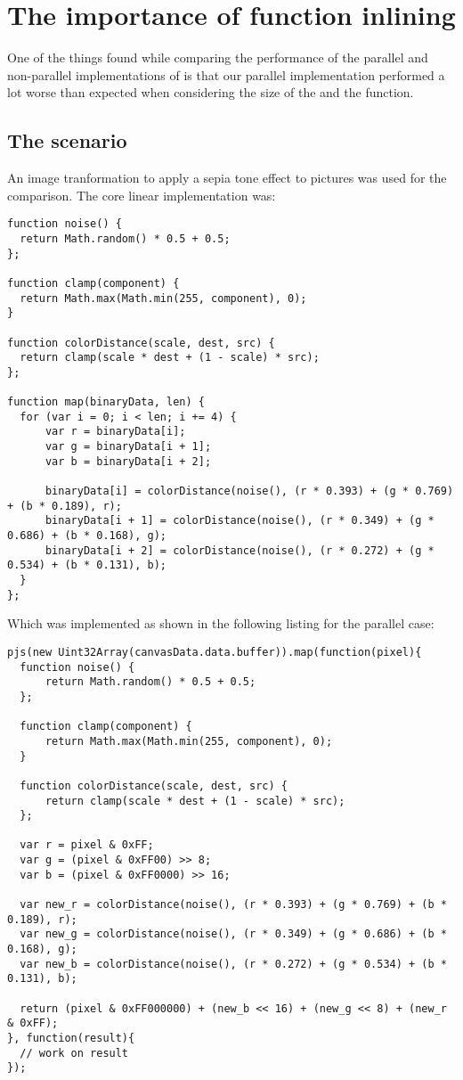 \section{The importance of function inlining}
One of the things found while comparing the performance of the parallel and non-parallel implementations of  is that our parallel implementation performed a lot worse than expected when considering the size of the \ttarray{} and the  function.

\subsection{The scenario}
An image tranformation to apply a sepia tone effect to pictures was used for the comparison. The core linear implementation was:
\begin{lstlisting}[caption=Sepia tone linear implementation]
function noise() {
  return Math.random() * 0.5 + 0.5;
};

function clamp(component) {
  return Math.max(Math.min(255, component), 0);
}

function colorDistance(scale, dest, src) {
  return clamp(scale * dest + (1 - scale) * src);
};

function map(binaryData, len) {
  for (var i = 0; i < len; i += 4) {
      var r = binaryData[i];
      var g = binaryData[i + 1];
      var b = binaryData[i + 2];

      binaryData[i] = colorDistance(noise(), (r * 0.393) + (g * 0.769) + (b * 0.189), r);
      binaryData[i + 1] = colorDistance(noise(), (r * 0.349) + (g * 0.686) + (b * 0.168), g);
      binaryData[i + 2] = colorDistance(noise(), (r * 0.272) + (g * 0.534) + (b * 0.131), b);
  }
};
\end{lstlisting}


Which was implemented as shown in the following listing for the parallel case:
\begin{lstlisting}[caption=Sepia tone initial parallel implementation]
pjs(new Uint32Array(canvasData.data.buffer)).map(function(pixel){
  function noise() {
      return Math.random() * 0.5 + 0.5;
  };

  function clamp(component) {
      return Math.max(Math.min(255, component), 0);
  }

  function colorDistance(scale, dest, src) {
      return clamp(scale * dest + (1 - scale) * src);
  };

  var r = pixel & 0xFF;
  var g = (pixel & 0xFF00) >> 8;
  var b = (pixel & 0xFF0000) >> 16;

  var new_r = colorDistance(noise(), (r * 0.393) + (g * 0.769) + (b * 0.189), r);
  var new_g = colorDistance(noise(), (r * 0.349) + (g * 0.686) + (b * 0.168), g);
  var new_b = colorDistance(noise(), (r * 0.272) + (g * 0.534) + (b * 0.131), b);

  return (pixel & 0xFF000000) + (new_b << 16) + (new_g << 8) + (new_r & 0xFF);
}, function(result){
  // work on result
});
\end{lstlisting}

